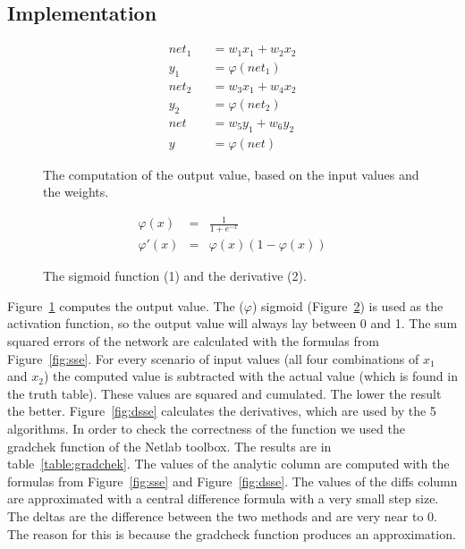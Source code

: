 \documentclass{article}
\begin{document}
\subsection{Implementation}
\begin{figure}[H]
	\centering
	\begin{eqnarray}
		net_1 &&= w_1x_1 + w_2x_2 \\
		y_1 &&= \varphi(net_1) \\
		net_2 &&= w_3x_1 + w_4x_2 \\
		y_2 &&= \varphi(net_2) \\
		net &&= w_5y_1 + w_6y_2\\
		y &&= \varphi(net)
	\end{eqnarray}
	\caption{The computation of the output value, based on the input values and the weights.}
	\label{fig:net}
\end{figure}

\begin{figure}[H]
	\centering
	\begin{eqnarray}
	 \varphi(x) & = & \frac{1}{1 + e^{-x}} \\
	   \varphi'(x) & = & \varphi(x)(1 - \varphi(x))
	\end{eqnarray}
	\caption{The sigmoid function (1) and the derivative (2).}
	\label{fig:sig}
\end{figure}

Figure~\ref{fig:net} computes the output value. The ($\varphi$) sigmoid (Figure~\ref{fig:sig}) is used as the activation function, so the output value will always lay between 0 and 1. The sum squared errors of the network are calculated with the formulas from Figure~\ref{fig:sse}. For every scenario of input values (all four combinations of $x_1$ and $x_2$) the computed value is subtracted with the actual value (which is found in the truth table). These values are squared and cumulated. The lower the result the better. Figure~\ref{fig:dsse} calculates the derivatives, which are used by the 5 algorithms. In order to check the correctness of the function we used the gradchek function of the Netlab toolbox. The results are in table~\ref{table:gradchek}. The values of the analytic column are computed with the formulas from Figure~\ref{fig:sse} and Figure~\ref{fig:dsse}. The values of the diffs column are approximated with a central difference formula with a very small step size. The deltas are the difference between the two methods and are very near to 0. The reason for this is because the gradcheck function produces an approximation. 
\end{document}
